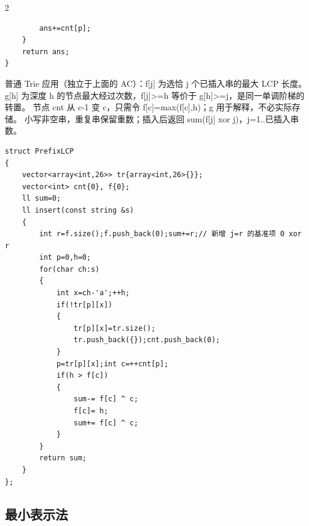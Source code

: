 \documentclass[UTF8,fontset=fandol,a4paper,twoside]{ctexart}
\newcommand{\note}[1]{{\fontsize{10}{12}\selectfont #1\par}}
\begin{document}
\begin{multicols}{2}
\begin{lstlisting}
        ans+=cnt[p];
    }
    return ans;
}
\end{lstlisting}
\note{普通 Trie 应用（独立于上面的 AC）：f[\allowbreak{}j]\allowbreak{} 为选恰 j 个已插入串的最大 LCP 长度。 g[\allowbreak{}h]\allowbreak{} 为深度 h 的节点最大经过次数，f[\allowbreak{}j]\allowbreak{}>\allowbreak{}=\allowbreak{}h 等价于 g[\allowbreak{}h]\allowbreak{}>\allowbreak{}=\allowbreak{}j，是同一单调阶梯的转置。 节点 cnt 从 c-\allowbreak{}1 变 c，只需令 f[\allowbreak{}c]\allowbreak{}=\allowbreak{}max(\allowbreak{}f[\allowbreak{}c]\allowbreak{},\allowbreak{}h)\allowbreak{}；g 用于解释，不必实际存储。 小写非空串，重复串保留重数；插入后返回 sum(\allowbreak{}f[\allowbreak{}j]\allowbreak{} xor j)\allowbreak{}，j=\allowbreak{}1.\allowbreak{}.\allowbreak{}已插入串数。}
\begin{lstlisting}
struct PrefixLCP
{
    vector<array<int,26>> tr{array<int,26>{}};
    vector<int> cnt{0}, f{0};
    ll sum=0;
    ll insert(const string &s)
    {
        int r=f.size();f.push_back(0);sum+=r;// 新增 j=r 的基准项 0 xor r
        int p=0,h=0;
        for(char ch:s)
        {
            int x=ch-'a';++h;
            if(!tr[p][x])
            {
                tr[p][x]=tr.size();
                tr.push_back({});cnt.push_back(0);
            }
            p=tr[p][x];int c=++cnt[p];
            if(h > f[c])
            {
                sum-= f[c] ^ c;
                f[c]= h;
                sum+= f[c] ^ c;
            }
        }
        return sum;
    }
};
\end{lstlisting}
\subsection{最小表示法}


\end{multicols}
\end{document}

